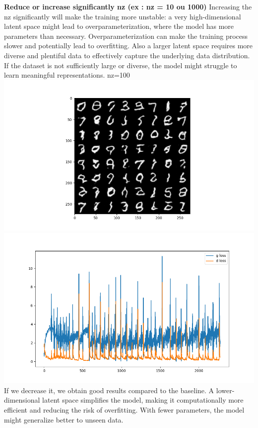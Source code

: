 \textbf{Reduce or increase significantly nz (ex : nz = 10 ou 1000)}
Increasing the nz significantly will make the training more unstable: a
very high-dimensional latent space might lead to overparameterization,
where the model has more parameters than necessary. Overparameterization
can make the training process slower and potentially lead to
overfitting. Also a larger latent space requires more diverse and
plentiful data to effectively capture the underlying data distribution.
If the dataset is not sufficiently large or diverse, the model might
struggle to learn meaningful representations. nz=100
\includegraphics{./images/Pasted image 20231228120800.png}\includegraphics{./images/Pasted image 20231228121144.png}
If we decrease it, we obtain good results compared to the baseline. A
lower-dimensional latent space simplifies the model, making it
computationally more efficient and reducing the risk of overfitting.
With fewer parameters, the model might generalize better to unseen data.
